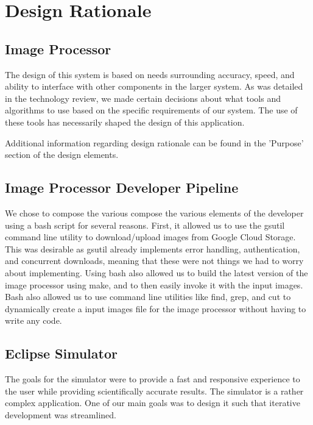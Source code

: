 \documentclass[10pt, onecolumn, draftclsnofoot, letterpaper, compsoc]{IEEEtran}
\begin{document}
\section{Design Rationale}

\subsection{Image Processor}

The design of this system is based on needs surrounding accuracy, speed, and
ability to interface with other components in the larger system. As was detailed
in the technology review, we made certain decisions about what tools and
algorithms to use based on the specific requirements of our system. The use of
these tools has necessarily shaped the design of this application.

Additional information regarding design rationale can be found in the 'Purpose'
section of the design elements. \\

\subsection{Image Processor Developer Pipeline}

We chose to compose the various compose the various elements of the developer using
a bash script for several reasons. First, it allowed us to use the gsutil command
line utility to download/upload images from Google Cloud Storage. This was desirable
as gsutil already implements error handling, authentication, and concurrent downloads,
meaning that these were not things we had to worry about implementing. Using bash also
allowed us to build the latest version of the image processor using make, and to
then easily invoke it with the input images. Bash also allowed us to use command line
utilities like find, grep, and cut to dynamically create a input images file for the image
processor without having to write any code. \\

\subsection{Eclipse Simulator}

The goals for the simulator were to provide a fast and
responsive experience to the user while providing
scientifically accurate results. The simulator is a rather
complex application. One of our main goals was to design it
such that iterative development was streamlined.
\end{document}
